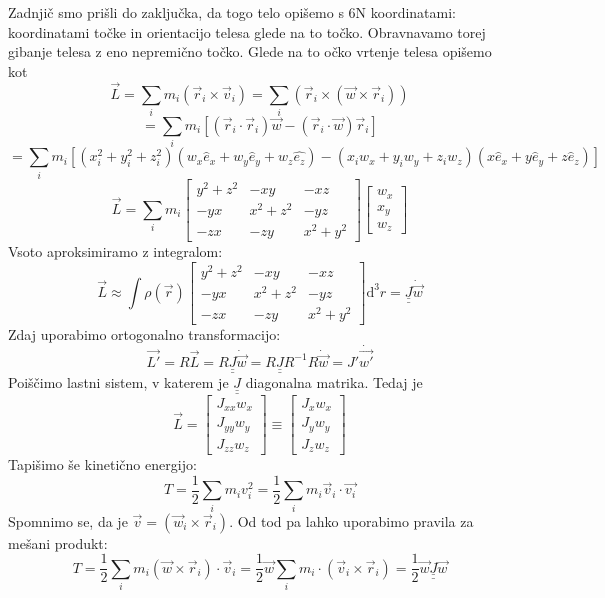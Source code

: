 \documentclass[a4paper]{article}
\newcommand{\vct}[1]{\overrightarrow{#1}}
\newcommand{\dif}{\mathrm{d}}
\begin{document}
Zadnjič smo prišli do zaključka, da togo telo opišemo s 6N koordinatami: koordinatami točke in orientacijo telesa glede na to točko. Obravnavamo torej
gibanje telesa z eno nepremično točko. Glede na to očko vrtenje telesa opišemo kot
$$\vct{L} = \sum_i m_i(\vct{r}_i\times\vct{v}_i)  =\sum_{i} \left(\vct{r}_i \times (\vct{w} \times \vct{r}_i)\right)$$
$$= \sum_{i}m_i\left[(\vct{r}_i\cdot\vct{r}_i)\vct{w} - (\vct{r}_i\cdot\vct{w})\vct{r}_i\right]$$
$$= \sum_im_i\left[(x_i^2 + y_i^2 + z_i^2)(w_x\hat{e}_x + w_y\hat{e}_y + w_z\hat{e_z}) - (x_iw_x + y_iw_y + z_iw_z)(x\hat{e}_x + y\hat{e}_y + z\hat{e}_z)\right]$$
$$\vct{L} = \sum_im_i\begin{bmatrix}
    y^2 + z^2 & -xy & -xz \\
    -yx & x^2 + z^2 & -yz \\
    -zx & -zy & x^2 + y^2
\end{bmatrix}\begin{bmatrix}
    w_x \\ x_y \\ w_z
\end{bmatrix}$$
Vsoto aproksimiramo z integralom:
$$\vct{L} \approx \int \rho(\vct{r}) \begin{bmatrix}
    y^2 + z^2 & -xy & -xz \\
    -yx & x^2 + z^2 & -yz \\
    -zx & -zy & x^2 + y^2
\end{bmatrix} \dif^3 r = \underline{\underline{J}}\dot{\vct{w}}$$
Zdaj uporabimo ortogonalno transformacijo:
$$\vct{L'} = R\vct{L} = R\underline{\underline{J}}\dot{\vct{w}} = R\underline{\underline{J}}R^{-1} R\dot{\vct{w}} = J'\dot{\vct{w'}}$$
Poiščimo lastni sistem, v katerem je $\underline{\underline{J}}$ diagonalna matrika. Tedaj je
$$\vct{L} = \begin{bmatrix}
    J_{xx}w_x \\ J_{yy}w_y \\ J_{zz}w_z
\end{bmatrix} \equiv \begin{bmatrix}
    J_xw_x \\ J_yw_y \\ J_zw_z
\end{bmatrix}$$
Tapišimo še kinetično energijo:
$$T = \frac{1}{2}\sum_im_iv_i^2 = \frac{1}{2}\sum_im_i\vct{v}_i\cdot\vct{v_i}$$
Spomnimo se, da je $\vct{v} = (\vct{w}_i\times\vct{r}_i)$. Od tod pa lahko uporabimo pravila za mešani produkt:
$$T = \frac{1}{2}\sum_im_i(\vct{w}\times\vct{r}_i)\cdot\vct{v}_i = \frac{1}{2}\vct{w}\sum_im_i\cdot(\vct{v}_i\times\vct{r}_i) = \frac{1}{2}\vct{w}\underline{\underline{J}}\vct{w}$$
\end{document}
